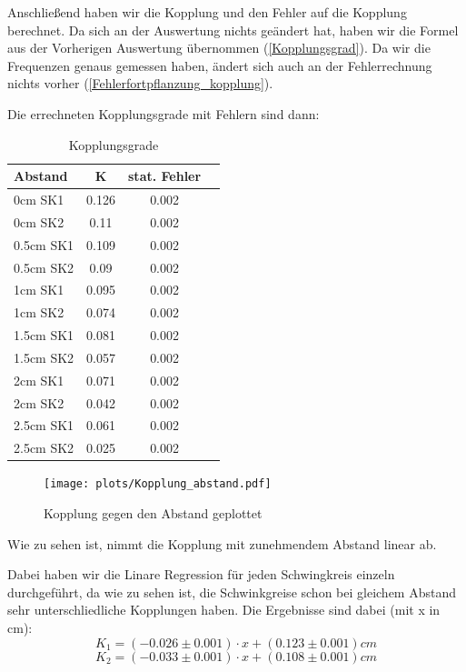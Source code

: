 \documentclass[twoside]{protokoll}
\begin{document}
Anschließend haben wir die Kopplung und den Fehler auf die Kopplung berechnet.
Da sich an der Auswertung nichts geändert hat, haben wir die Formel aus der Vorherigen Auswertung übernommen (\ref{Kopplungsgrad}).
Da wir die Frequenzen genaus gemessen haben, ändert sich auch an der Fehlerrechnung nichts vorher (\ref{Fehlerfortpflanzung_kopplung}).

Die errechneten Kopplungsgrade mit Fehlern sind dann:
\begin{table}[H]
        \centering
        \caption{Kopplungsgrade}
        \begin{tabularx}{0.7\textwidth}{X c c c}
            \toprule
            \textbf{Abstand} & \textbf{K} & \textbf{stat. Fehler} \\
            \midrule
            0cm SK1 &  0.126  & 0.002 \\
            0cm SK2 &  0.11  & 0.002 \\
            0.5cm SK1 &  0.109  & 0.002 \\
            0.5cm SK2 &  0.09  & 0.002 \\
            1cm SK1 &  0.095  & 0.002 \\
            1cm SK2 &  0.074  & 0.002 \\
            1.5cm SK1 &  0.081  & 0.002 \\
            1.5cm SK2 &  0.057  & 0.002 \\
            2cm SK1 &  0.071  & 0.002 \\
            2cm SK2 &  0.042  & 0.002 \\
            2.5cm SK1 &  0.061  & 0.002 \\
            2.5cm SK2 &  0.025  & 0.002 \\
            \bottomrule
        \end{tabularx}
        \label{tab:mytable}
\end{table}

\begin{figure}[H]
    \centering
    \texttt{[image: plots/Kopplung\_abstand.pdf]}
    \caption{Kopplung gegen den Abstand geplottet}
\end{figure}
Wie zu sehen ist, nimmt die Kopplung mit zunehmendem Abstand linear ab.

Dabei haben wir die Linare Regression für jeden Schwingkreis einzeln durchgeführt, da wie zu sehen ist, die Schwinkgreise schon bei gleichem Abstand sehr unterschliedliche Kopplungen haben.
Die Ergebnisse sind dabei (mit x in cm):
\begin{equation}
    K_1 = (-0.026 \pm 0.001) \cdot x + (0.123 \pm 0.001) cm
\end{equation}
\begin{equation}
    K_2 = (-0.033 \pm 0.001) \cdot x + (0.108 \pm 0.001) cm
\end{equation}
\end{document}
